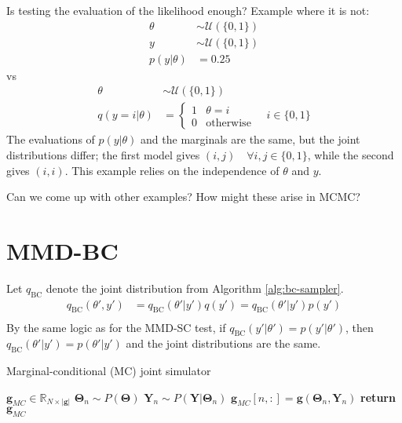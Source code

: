 \documentclass[a4paper,11pt]{article}
\begin{document}
Is testing the evaluation of the likelihood enough? Example where it is not:
\begin{align*}
    \theta &\sim \mathcal{U}(\{0, 1\}) \\
    y &\sim \mathcal{U}(\{0, 1\}) \\
    p(y | \theta) &= 0.25
\end{align*}
vs
\begin{align*}
    \theta &\sim \mathcal{U}(\{0, 1\}) \\
    q(y=i|\theta) &= \begin{cases}
                            1 & \theta = i \\
                            0 & \text{otherwise}
                        \end{cases} \quad i \in \{0, 1\}
\end{align*}
The evaluations of $p(y | \theta)$ and the marginals are the same, but the joint distributions differ; the first model gives $(i, j) \quad \forall i, j \in \{0,1\}$, while the second gives $(i, i)$. This example relies on the independence of $\theta$ and $y$. 

Can we come up with other examples? How might these arise in MCMC?

\section{MMD-BC}
Let $q_{\text{BC}}$ denote the joint distribution from Algorithm \ref{alg:bc-sampler}.
\begin{align*}
    q_{\text{BC}}(\theta', y') &= q_{\text{BC}}(\theta'|y')q(y') = q_{\text{BC}}(\theta'|y')p(y') \\
\end{align*}
By the same logic as for the MMD-SC test, if $q_{\text{BC}}(y' | \theta') = p(y' | \theta')$, then $q_{\text{BC}}(\theta' | y') = p(\theta' | y')$ and the joint distributions are the same.
\newpage 

\begin{algorithm}
    \centering
    \caption{Marginal-conditional (MC) joint simulator}\label{alg:mc-sampler}
    \begin{algorithmic}[1]
        \State {} $\mathbf{g}_{MC} \in \mathbb{R}_{N\times |\mathbf{g}|}$
            \State $\mathbf{\Theta}_{n} \sim P(\mathbf{\Theta})$ 
            \State $\mathbf{Y}_{n} \sim P(\mathbf{Y}|\mathbf{\Theta}_{n})$ 
            \State $\mathbf{g}_{MC}[n, :] = \mathbf{g}(\mathbf{\Theta}_{n}, \mathbf{Y}_{n})$ 
        \EndFor        
        \State \textbf{return} $\mathbf{g}_{MC}$
    \end{algorithmic}
\end{algorithm}
\end{document}
